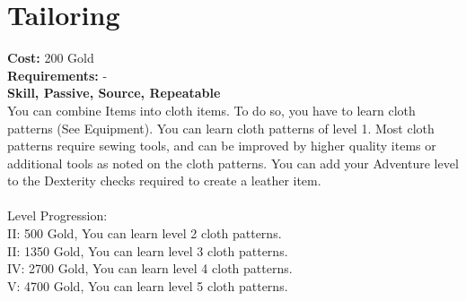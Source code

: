 \section*{Tailoring}
\textbf{Cost:} 200 Gold\\
\textbf{Requirements:} -\\
\textbf{Skill, Passive, Source, Repeatable}\\
You can combine Items into cloth items. To do so, you have to learn cloth patterns (See Equipment). You can learn cloth patterns of level 1. Most cloth patterns require sewing tools, and can be improved by higher quality items or additional tools as noted on the cloth patterns. You can add your Adventure level to the Dexterity checks required to create a leather item.\\
\\
Level Progression:\\
II: 500 Gold, You can learn level 2 cloth patterns.\\
II: 1350 Gold, You can learn level 3 cloth patterns.\\
IV: 2700 Gold, You can learn level 4 cloth patterns.\\
V: 4700 Gold, You can learn level 5 cloth patterns.\\